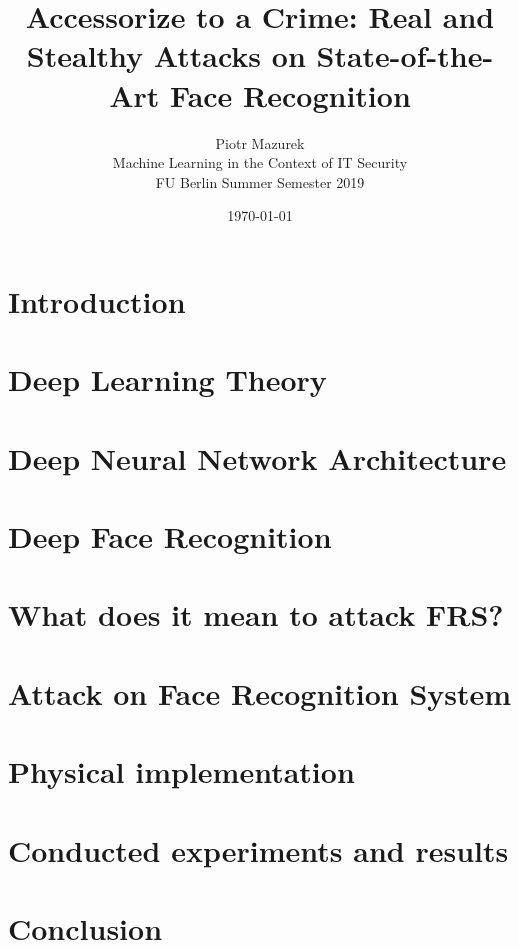 \documentclass[fontsize=12pt,a4paper]{scrartcl}
\title{Accessorize to a Crime: Real and Stealthy Attacks on
State-of-the-Art Face Recognition}
\author{Piotr Mazurek\\
		Machine Learning in the Context of IT Security\\
		FU Berlin Summer Semester 2019\\}
\date{\today}
\begin{document}
	\maketitle
	\begin{abstract}
    	
	\end{abstract}

	\section{Introduction}
    
        
        
	\section{Deep Learning Theory}
	
	
    
    \section{Deep Neural Network Architecture}
    

	\section{Deep Face Recognition}
	
    
    
    \section{What does it mean to attack FRS?}
    
    

	\section{Attack on Face Recognition System}
	
	
	\section{Physical implementation}
    
	
	\section{Conducted experiments and results}
    
	
	
	\section{Conclusion}
	
	
	\newpage
	
	\begin{thebibliography}{9}
	    
	\end{thebibliography}
\end{document}
